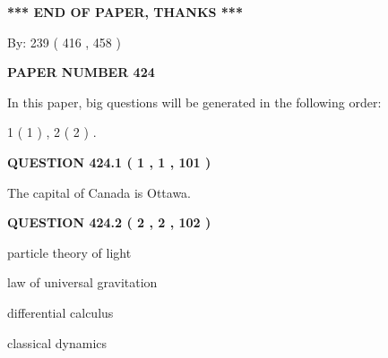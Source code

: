 \documentclass[12pt]{article}
\begin{document}
 
 
 
   
   
\vspace{1.0in} 
{\textbf{\large{ *** END OF PAPER, THANKS *** }}} 
   
   
\hspace{1.0in} By: 
 239 ( 416 ,  458 )
   
   
   
   
\newpage 
\setcounter{page}{ 
   424001 } 
   
   
   
   
 {\textbf{ \Large{ PAPER NUMBER  424  }}}
   
   
\vspace{0.2in}
   
   
   
   
   
\vspace{0.2in}
   
In this paper, big questions will be generated in the following order: 
   
   
   1 ( 1 )
 ,
   2 ( 2 )
 .
  
\vspace{0.2in}
  
{\textbf{\Large{QUESTION
424.1 
 ( 1 , 1 , 101 )
}}}
  
  
 
 
\noindent{}
 
 
The capital of Canada is Ottawa.
 
 
 
 
  
\vspace{0.2in}
  
{\textbf{\Large{QUESTION
424.2 
 ( 2 , 2 , 102 )
}}}
  
  
 
 
\noindent{}
 
 
particle theory of light
 
 
law of universal gravitation
 
 
differential calculus
 
 
classical dynamics
 
\end{document}
